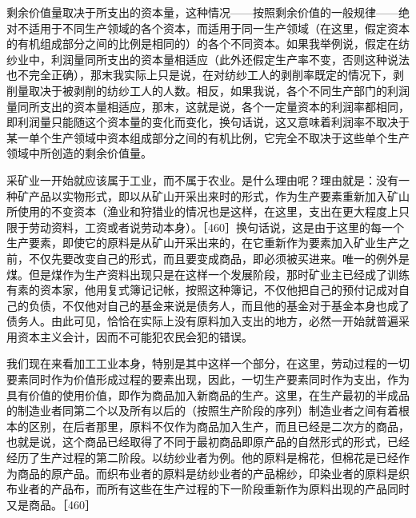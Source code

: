 剩余价值量取决于所支出的资本量，这种情况——按照剩余价值的一般规律——绝对不适用于不同生产领域的各个资本，而适用于同一生产领域（在这里，假定资本的有机组成部分之间的比例是相同的）的各个不同资本。如果我举例说，假定在纺纱业中，利润量同所支出的资本量相适应（此外还假定生产率不变，否则这种说法也不完全正确），那末我实际上只是说，在对纺纱工人的剥削率既定的情况下，剥削量取决于被剥削的纺纱工人的人数。相反，如果我说，各个不同生产部门的利润量同所支出的资本量相适应，那末，这就是说，各个一定量资本的利润率都相同，即利润量只能随这个资本量的变化而变化，换句话说，这又意味着利润率不取决于某一单个生产领域中资本组成部分之间的有机比例，它完全不取决于这些单个生产领域中所创造的剩余价值量。

采矿业一开始就应该属于工业，而不属于农业。是什么理由呢？理由就是：没有一种矿产品以实物形式，即以从矿山开采出来时的形式，作为生产要素重新加入矿山所使用的不变资本（渔业和狩猎业的情况也是这样，在这里，支出在更大程度上只限于劳动资料，工资或者说劳动本身）。［460］换句话说，这是由于这里的每一个生产要素，即使它的原料是从矿山开采出来的，在它重新作为要素加入矿业生产之前，不仅先要改变自己的形式，而且要变成商品，即必须被买进来。唯一的例外是煤。但是煤作为生产资料出现只是在这样一个发展阶段，那时矿业主已经成了训练有素的资本家，他用复式簿记记帐，按照这种簿记，不仅他把自己的预付记成对自己的负债，不仅他对自己的基金来说是债务人，而且他的基金对于基金本身也成了债务人。由此可见，恰恰在实际上没有原料加入支出的地方，必然一开始就普遍采用资本主义会计，因而不可能犯农民会犯的错误。

我们现在来看加工工业本身，特别是其中这样一个部分，在这里，劳动过程的一切要素同时作为价值形成过程的要素出现，因此，一切生产要素同时作为支出，作为具有价值的使用价值，即作为商品加入新商品的生产。这里，在生产最初的半成品的制造业者同第二个以及所有以后的（按照生产阶段的序列）制造业者之间有着根本的区别，在后者那里，原料不仅作为商品加入生产，而且已经是二次方的商品，也就是说，这个商品已经取得了不同于最初商品即原产品的自然形式的形式，已经经历了生产过程的第二阶段。以纺纱业者为例。他的原料是棉花，但棉花是已经作为商品的原产品。而织布业者的原料是纺纱业者的产品棉纱，印染业者的原料是织布业者的产品布，而所有这些在生产过程的下一阶段重新作为原料出现的产品同时又是商品。［460］

